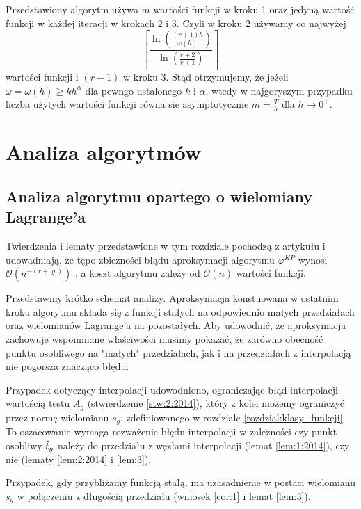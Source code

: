 \documentclass[oik, pdftex, robocza, man]{mgrwms}
\begin{document}
    Przedstawiony algorytm używa $m$ wartości funkcji w kroku 1 oraz jedyną wartość funkcji w każdej iteracji w krokach 2 i 3. Czyli w kroku 2 używamy co najwyżej
    \begin{equation*}
        \left\lceil\frac{\ln \left(\frac{(r+1) h}{\omega(h)}\right)}{\ln \left(\frac{r+2}{r+1}\right)}\right\rceil
    \end{equation*}
    wartości funkcji i $(r-1)$ w kroku 3.
    Stąd otrzymujemy, że jeżeli $\omega = \omega(h) \geq kh^{\alpha}$ dla pewngo ustalonego $k$ i $\alpha$, wtedy w najgoryszym przypadku liczba użytych wartości funkcji równa sie asymptotycznie $m = \frac{T}{h}$ dla $h \rightarrow 0^{+}$.


\mgrclosechapter


\chapter{Analiza algorytmów} \label{rozdzial:analiza_alg}


\section{Analiza algorytmu opartego o wielomiany Lagrange'a}

    Twierdzenia i lematy przedstawione w tym rozdziale pochodzą z artykułu \cite{CoDF} i udowadniają, że tępo zbieżności błądu aproksymacji algorytmu $\varphi^{KP}$ wynosi $\mathcal{O}(n^{-(r+\varrho)})$ , a koszt algorytmu zależy od $\mathcal{O}(n)$ wartości funkcji.

    Przedstawmy krótko schemat analizy. Aproksymacja konstuowana w ostatnim kroku algorytmu składa się z funkcji stałych na odpowiednio małych przedziałach oraz wielomianów Lagrange'a na pozostałych. Aby udowodnić, że aproksymacja zachowuje wspomniane właściwości musimy pokazać, że zarówno obecność punktu osobliwego na "małych" przedziałach, jak i na przedziałach z interpolacją nie pogorsza znacząco błędu.

    Przypadek dotyczący interpolacji udowodniono, ograniczając błąd interpolacji wartością testu $A_{g}$ (stwierdzenie \ref{stw:2:2014}), który z kolei możemy ograniczyć przez normę wielomianu $s_{g}$, zdefiniowanego w rozdziale \ref{rozdzial:klasy_funkcji}. To oszacowanie wymaga rozważenie błędu interpolacji w zależności czy punkt osobliwy $\hat{t}_{g}$ należy do przedziału z węzłami interpolacji (lemat \ref{lem:1:2014}), czy nie (lematy \ref{lem:2:2014} i \ref{lem:3}).
    
    Przypadek, gdy przybliżamy funkcją stałą, ma uzasadnienie w postaci wielomianu $s_{g}$ w połączeniu z długością przedziału (wniosek \ref{cor:1} i lemat \ref{lem:3}).
\end{document}

